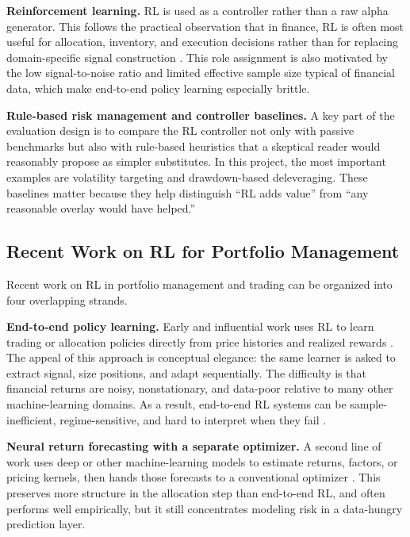 \documentclass[11pt]{article}
\begin{document}
\textbf{Reinforcement learning.} RL is used as a controller rather than a raw
alpha generator. This follows the practical observation that in finance, RL is
often most useful for allocation, inventory, and execution decisions rather than
for replacing domain-specific signal construction \cite{sutton2018,almgren2000}.
This role assignment is also motivated by the low signal-to-noise ratio and
limited effective sample size typical of financial data, which make end-to-end
policy learning especially brittle.

\textbf{Rule-based risk management and controller baselines.} A key part of the
evaluation design is to compare the RL controller not only with passive
benchmarks but also with rule-based heuristics that a skeptical reader would
reasonably propose as simpler substitutes. In this project, the most important
examples are volatility targeting and drawdown-based deleveraging. These
baselines matter because they help distinguish ``RL adds value'' from ``any
reasonable overlay would have helped.''

\subsection{Recent Work on RL for Portfolio Management}

Recent work on RL in portfolio management and trading can be organized into four
overlapping strands.

\textbf{End-to-end policy learning.} Early and influential work uses RL to learn
trading or allocation policies directly from price histories and realized
rewards \cite{moody2001,deng2017,jiang2017,zhang2020,cong2021,pacheco2023}. The appeal of
this approach is conceptual elegance: the same learner is asked to extract
signal, size positions, and adapt sequentially. The difficulty is that
financial returns are noisy, nonstationary, and data-poor relative to many
other machine-learning domains. As a result, end-to-end RL systems can be
sample-inefficient, regime-sensitive, and hard to interpret when they fail
\cite{gu2020,kolm2019,jander2025}.

\textbf{Neural return forecasting with a separate optimizer.} A second line of
work uses deep or other machine-learning models to estimate returns, factors, or
pricing kernels, then hands those forecasts to a conventional optimizer
\cite{gu2020,chen2021,giglio2022}. This preserves more structure in the
allocation step than end-to-end RL, and often performs well empirically, but it
still concentrates modeling risk in a data-hungry prediction layer.
\end{document}
